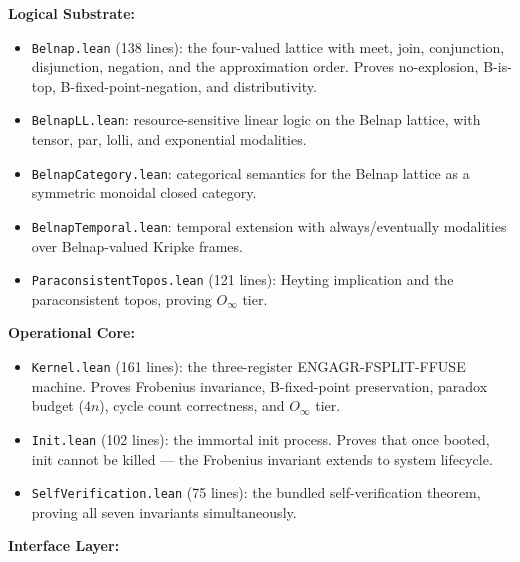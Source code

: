 \documentclass[10pt,a4paper]{article}
\begin{document}
\textbf{Logical Substrate:}

\begin{itemize}
    \item \texttt{Belnap.\allowbreak lean} (138 lines): the four-valued lattice with meet, join, conjunction, disjunction, negation, and the approximation order. Proves no-explosion, B-is-top, B-fixed-point-negation, and distributivity.
    \item \texttt{BelnapLL.\allowbreak lean}: resource-sensitive linear logic on the Belnap lattice, with tensor, par, lolli, and exponential modalities.
    \item \texttt{BelnapCategory.\allowbreak lean}: categorical semantics for the Belnap lattice as a symmetric monoidal closed category.
    \item \texttt{BelnapTemporal.\allowbreak lean}: temporal extension with always/eventually modalities over Belnap-valued Kripke frames.
    \item \texttt{ParaconsistentTopos.\allowbreak lean} (121 lines): Heyting implication and the paraconsistent topos, proving $O_{\infty}$ tier.
\end{itemize}

\textbf{Operational Core:}

\begin{itemize}
    \item \texttt{Kernel.\allowbreak lean} (161 lines): the three-register ENGAGR-FSPLIT-FFUSE machine. Proves Frobenius invariance, B-fixed-point preservation, paradox budget ($4n$), cycle count correctness, and $O_{\infty}$ tier.
    \item \texttt{Init.\allowbreak lean} (102 lines): the immortal init process. Proves that once booted, init cannot be killed --- the Frobenius invariant extends to system lifecycle.
    \item \texttt{SelfVerification.\allowbreak lean} (75 lines): the bundled self-verification theorem, proving all seven invariants simultaneously.
\end{itemize}

\textbf{Interface Layer:}
\end{document}

